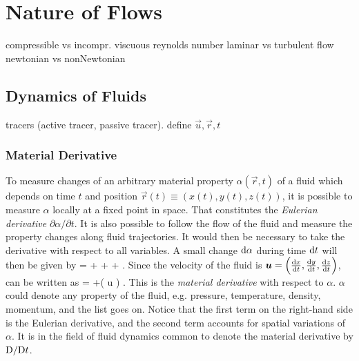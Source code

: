 \chapter{Nature of Flows} 

compressible vs incompr.
viscuous
reynolds number
laminar vs turbulent flow
newtonian vs nonNewtonian

\section{Dynamics of Fluids}

tracers (active tracer, passive tracer). 
define $\vec u, \vec r, t$

\subsection{Material Derivative}

To measure changes of an arbitrary material property $\alpha(\vec r, t)$ of a fluid which depends on time $t$ and position $\vec r(t) \equiv (x(t), y(t), z(t))$, it is possible to measure $\alpha$ locally at a fixed point in space. That constitutes the \emph{Eulerian derivative} $\partial\alpha / \partial t$. It is also possible to follow the flow of the fluid and measure the property changes along fluid trajectories. It would then be necessary to take the derivative with respect to all variables. 
A small change $\mathrm{d} \alpha$ during time $\mathrm{d} t$ will then be given by
\beq
{} =  +  +  + .
\eeq
Since the velocity of the fluid is $\boldsymbol{u} = \left(\frac{\mathrm{d} x}{\mathrm{d} t},\frac{\mathrm{d} y}{\mathrm{d} t},\frac{\mathrm{d} z}{\mathrm{d} t}\right)$,  can be written as
\beq
{} =  +( \vec u \cdot \nabla) \alpha.
\eeq
This is the \emph{material derivative} with respect to $\alpha$. $\alpha$ could denote any property of the fluid, e.g. pressure, temperature, density, momentum, and the list goes on. Notice that the first term on the right-hand side is the Eulerian derivative, and the second term accounts for spatial variations of $\alpha$. It is in the field of fluid dynamics common to denote the material derivative by $\mathrm{D}/\mathrm{D} t$. 

